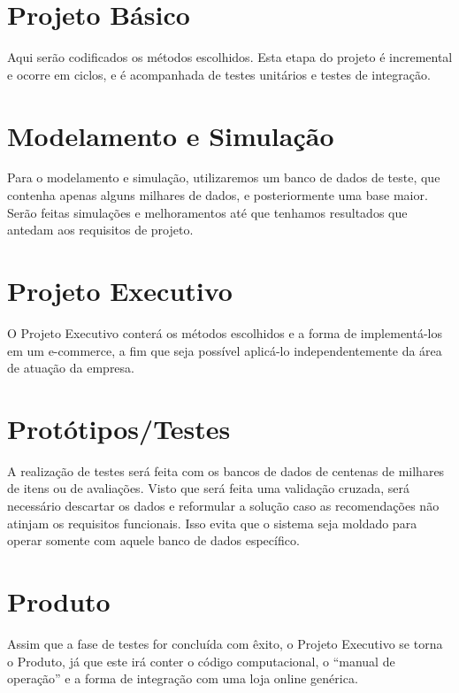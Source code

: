\section{Projeto Básico} %
\label{sec:projeto_b_sico}


Aqui serão codificados os métodos escolhidos. Esta etapa do projeto é incremental e ocorre em ciclos, e é acompanhada de testes unitários e testes de integração. 

\section{Modelamento e Simulação} %
\label{sec:modelamento_e_simula_o}


Para o modelamento e simulação, utilizaremos um banco de dados de teste, que contenha apenas alguns milhares de dados, e posteriormente uma base maior. Serão feitas simulações e melhoramentos até que tenhamos resultados que antedam aos requisitos de projeto.

\section{Projeto Executivo} %
\label{sec:projeto_executivo}


O Projeto Executivo conterá os métodos escolhidos e a forma de implementá-los em um e-commerce, a fim que seja possível aplicá-lo independentemente da área de atuação da empresa.

\section{Protótipos/Testes} %
\label{sec:prot_tipos_testes}


A realização de testes será feita com os bancos de dados de centenas de milhares de itens ou de avaliações. Visto que será feita uma validação cruzada, será necessário descartar os dados e reformular a solução caso as recomendações não atinjam os requisitos funcionais. Isso evita que o sistema seja moldado para operar somente com aquele banco de dados específico.

\section{Produto} %
\label{sec:produto}


Assim que a fase de testes for concluída com êxito, o Projeto Executivo se torna o Produto, já que este irá conter o código computacional, o ``manual de operação'' e a forma de integração com uma loja online genérica.